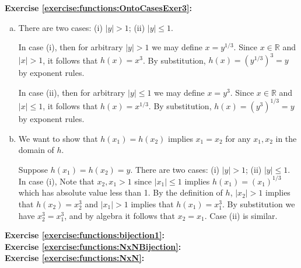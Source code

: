 \noindent\textbf{Exercise \ref{exercise:functions:OntoCasesExer3}:} %
\begin{enumerate}[(a)]
\item
There are two cases: (i) $|y|>1$; (ii) $|y|\le 1$.  

In case (i), then for arbitrary $|y|>1$ we may define $x = y^{1/3}$.  Since $x \in \mathbb{R}$ and $|x|>1$, it follows that $h(x) = x^3 $. By substitution, $h(x) = (y^{1/3})^3 = y$ by exponent rules. 

In case (ii), then for arbitrary $|y|\le1$ we may define $x = y^3$.  Since $x \in \mathbb{R}$ and $|x|\le 1$, it follows that $h(x) = x^{1/3} $. By substitution, $h(x) = (y^{3})^{1/3} = y$ by exponent rules.
\item
We want to show that $h(x_1)=h(x_2)$ implies $x_1=x_2$ for any $x_1,x_2$ in the domain of $h$.

Suppose $h(x_1)=h(x_2)=y$. There are two cases: (i) $|y|>1$; (ii) $|y|\le 1$. In case (i), Note that $x_2,x_1 >1$ since $|x_1| \le1$ implies $h(x_1) = (x_1)^{1/3}$ which has absolute value less than 1. By the definition of $h$, $|x_2| > 1$ implies that $h(x_2) = x_2^3$ and $|x_1| > 1$ implies that $h(x_1) = x_1^3$. By substitution we have $x_2^3 = x_1^3$, and by algebra it follows that $x_2=x_1$. Case (ii) is similar. 
\end{enumerate}


\noindent\textbf{Exercise \ref{exercise:functions:bijection1}:}\\

\noindent\textbf{Exercise \ref{exercise:functions:NxNBijection}:}\\

\noindent\textbf{Exercise \ref{exercise:functions:NxN}:}\\

